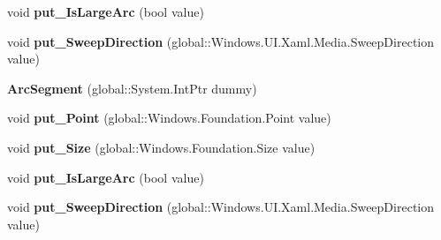 \begin{DoxyCompactItemize}
\item 
\mbox{\label{class_windows_1_1_u_i_1_1_xaml_1_1_media_1_1_arc_segment_acd90b8a046abf2f9ce5f5d8f96ef7518}} 
void {\bfseries put\+\_\+\+Is\+Large\+Arc} (bool value)
\item 
\mbox{\label{class_windows_1_1_u_i_1_1_xaml_1_1_media_1_1_arc_segment_a82728182889ceaef7ff54beab34e9b94}} 
void {\bfseries put\+\_\+\+Sweep\+Direction} (global\+::\+Windows.\+U\+I.\+Xaml.\+Media.\+Sweep\+Direction value)
\item 
\mbox{\label{class_windows_1_1_u_i_1_1_xaml_1_1_media_1_1_arc_segment_a429457ddfea0ab424e587c2be0398db2}} 
{\bfseries Arc\+Segment} (global\+::\+System.\+Int\+Ptr dummy)
\item 
\mbox{\label{class_windows_1_1_u_i_1_1_xaml_1_1_media_1_1_arc_segment_ae3cc83e3cf50e15df1a76fe35abd93c5}} 
void {\bfseries put\+\_\+\+Point} (global\+::\+Windows.\+Foundation.\+Point value)
\item 
\mbox{\label{class_windows_1_1_u_i_1_1_xaml_1_1_media_1_1_arc_segment_af67de1df1942a7178681283b9126b59e}} 
void {\bfseries put\+\_\+\+Size} (global\+::\+Windows.\+Foundation.\+Size value)
\item 
\mbox{\label{class_windows_1_1_u_i_1_1_xaml_1_1_media_1_1_arc_segment_acd90b8a046abf2f9ce5f5d8f96ef7518}} 
void {\bfseries put\+\_\+\+Is\+Large\+Arc} (bool value)
\item 
\mbox{\label{class_windows_1_1_u_i_1_1_xaml_1_1_media_1_1_arc_segment_a82728182889ceaef7ff54beab34e9b94}} 
void {\bfseries put\+\_\+\+Sweep\+Direction} (global\+::\+Windows.\+U\+I.\+Xaml.\+Media.\+Sweep\+Direction value)
\item 
\mbox{\label{class_windows_1_1_u_i_1_1_xaml_1_1_media_1_1_arc_segment_a429457ddfea0ab424e587c2be0398db2}} 

\end{DoxyCompactItemize}
